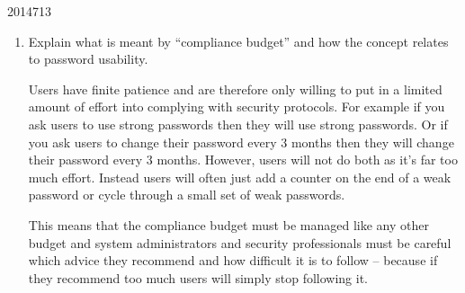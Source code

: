 \documentclass[10pt,\jkfside,a4paper]{article}
\begin{document}
\begin{enumerate}
\begin{examquestion}{2014}{7}{13}
\begin{enumerate}[label=(\alph*)]






\item Explain what is meant by ``compliance budget'' and how the concept relates to 
password usability.

Users have finite patience and are therefore only willing to put in a limited amount of effort into complying with
security protocols.
For example if you ask users to use strong passwords then they will use strong passwords. Or if you ask users to
change their password every 3 months then they will change their password every 3 months. However, users will not do
both as it's far too much effort. Instead users will often just add a counter on the end of a weak password
or cycle through a small set of weak passwords.

This means that the compliance budget must be managed like any other budget and system administrators and security
professionals must be careful which advice they recommend and how difficult it is to follow -- because if they
recommend too much users will simply stop following it.

\end{enumerate}

\end{examquestion}

\end{enumerate}
\end{document}
